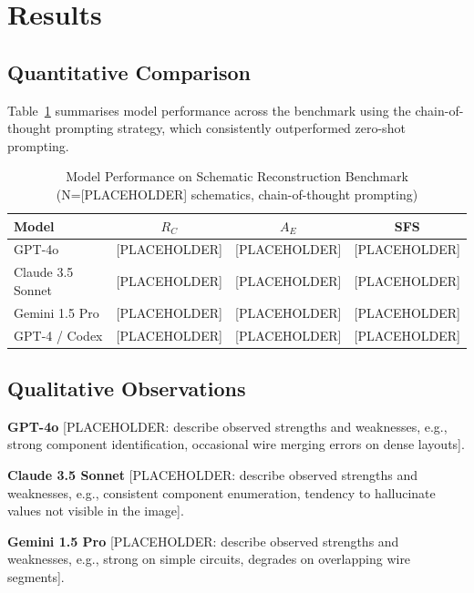 \documentclass[conference]{IEEEtran}
\begin{document}
\section{Results}

\subsection{Quantitative Comparison}

Table~\ref{tab:results} summarises model performance across the benchmark using the chain-of-thought prompting strategy, which consistently outperformed zero-shot prompting.

\begin{table}[htbp]
\caption{Model Performance on Schematic Reconstruction Benchmark\\(N=[PLACEHOLDER] schematics, chain-of-thought prompting)}
\begin{center}
\begin{tabular}{|l|c|c|c|}
\hline
\textbf{Model} & \textbf{$R_C$} & \textbf{$A_E$} & \textbf{SFS} \\
\hline
GPT-4o          & [PLACEHOLDER] & [PLACEHOLDER] & [PLACEHOLDER] \\
Claude 3.5 Sonnet & [PLACEHOLDER] & [PLACEHOLDER] & [PLACEHOLDER] \\
Gemini 1.5 Pro  & [PLACEHOLDER] & [PLACEHOLDER] & [PLACEHOLDER] \\
GPT-4 / Codex   & [PLACEHOLDER] & [PLACEHOLDER] & [PLACEHOLDER] \\
\hline
\end{tabular}
\label{tab:results}
\end{center}
\end{table}

\subsection{Qualitative Observations}

\textbf{GPT-4o} [PLACEHOLDER: describe observed strengths and weaknesses, e.g., strong component identification, occasional wire merging errors on dense layouts].

\textbf{Claude 3.5 Sonnet} [PLACEHOLDER: describe observed strengths and weaknesses, e.g., consistent component enumeration, tendency to hallucinate values not visible in the image].

\textbf{Gemini 1.5 Pro} [PLACEHOLDER: describe observed strengths and weaknesses, e.g., strong on simple circuits, degrades on overlapping wire segments].
\end{document}
